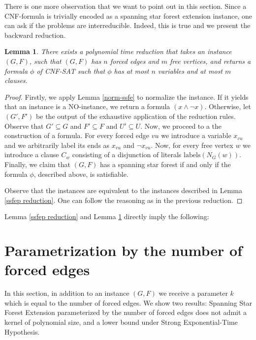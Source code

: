 \documentclass[en]{pracamgr}
\newtheorem{lemma}{Lemma}
\theoremstyle{definition}
\newcommand{\ssfep}{{\sc Spanning Star Forest Extension}}
\newcommand{\cnfsat}{{\sc CNF-SAT}}
\begin{document}
There is one more observation that we want to point out in this section. Since a CNF-formula is trivially encoded as a spanning star forest extension instance, one can ask if the problems are interreducible. Indeed, this is true and we present the backward reduction.

\begin{lemma}\label{cnfsat reduction}
	There exists a polynomial time reduction that takes an instance $(G,F)$, such that $(G,F)$ has $n$ forced edges and $m$ free vertices, and returns a formula $\phi$ of \cnfsat{} such that $\phi$ has at most $n$ variables and at most $m$ clauses.
\end{lemma}

\begin{proof}
	Firstly, we apply Lemma \ref{norm-ssfe} to normalize the instance. If it yields that an instance is a NO-instance, we return a formula $(x \land \neg x)$. Otherwise, let $(G',F')$ be the output of the exhaustive application of the reduction rules. Observe that $G' \subseteq G$ and $F' \subseteq F$ and $U' \subseteq U$. Now, we proceed to a the construction of a formula. For every forced edge $vu$ we introduce a variable $x_{vu}$ and we arbitrarily label its ends as $x_{vu}$ and $\neg x_{vu}$. Now, for every free vertex $w$ we introduce a clause $C_w$ consisting of a disjunction of literals $\textrm{labels}(N_G(w))$. Finally, we claim that $(G,F)$ has a spanning star forest if and only if the formula $\phi$, described above, is satisfiable.
	
	Observe that the instances are equivalent to the instances described in Lemma \ref{ssfep reduction}. One can follow the reasoning as in the previous reduction.
\end{proof}

Lemma \ref{ssfep reduction} and Lemma \ref{cnfsat reduction} directly imply the following:

\thmssfepnpc*

\section{Parametrization by the number of forced edges}

In this section, in addition to an instance $(G,F)$ we receive a parameter $k$ which is equal to the number of forced edges. We show two results: \ssfep{} parameterized by the number of forced edges does not admit a kernel of polynomial size, and a lower bound under Strong Exponential-Time Hypothesis.
\end{document}
